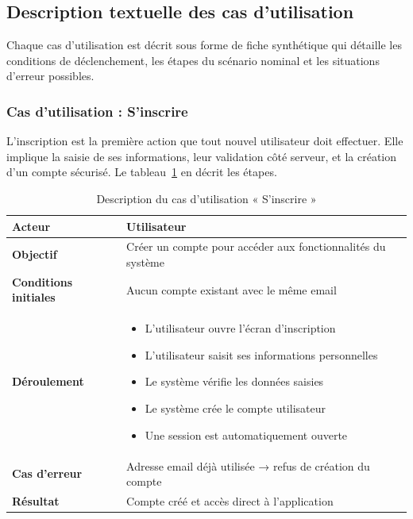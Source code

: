 \subsection{Description textuelle des cas d’utilisation}

Chaque cas d’utilisation est décrit sous forme de fiche synthétique qui détaille les conditions de déclenchement, les étapes du scénario nominal et les situations d’erreur possibles.

\subsubsection{Cas d’utilisation : S’inscrire}

L’inscription est la première action que tout nouvel utilisateur doit effectuer. Elle implique la saisie de ses informations, leur validation côté serveur, et la création d’un compte sécurisé. Le tableau~\ref{tab:uc_register} en décrit les étapes.

\begin{table}[H]
\centering
\renewcommand{\arraystretch}{1.2}
\begin{tabular}{|p{4cm}|p{10cm}|}
\hline
\textbf{Acteur} & Utilisateur \\ \hline

\textbf{Objectif} & Créer un compte pour accéder aux fonctionnalités du système \\ \hline

\textbf{Conditions initiales} & Aucun compte existant avec le même email \\ \hline

\textbf{Déroulement} &
\begin{itemize}
    \item L’utilisateur ouvre l’écran d’inscription
    \item L’utilisateur saisit ses informations personnelles
    \item Le système vérifie les données saisies
    \item Le système crée le compte utilisateur
    \item Une session est automatiquement ouverte
\end{itemize} \\ \hline

\textbf{Cas d’erreur} & Adresse email déjà utilisée → refus de création du compte \\ \hline

\textbf{Résultat} & Compte créé et accès direct à l’application \\ \hline
\end{tabular}
\caption{Description du cas d’utilisation « S’inscrire »}
\label{tab:uc_register}
\end{table}

